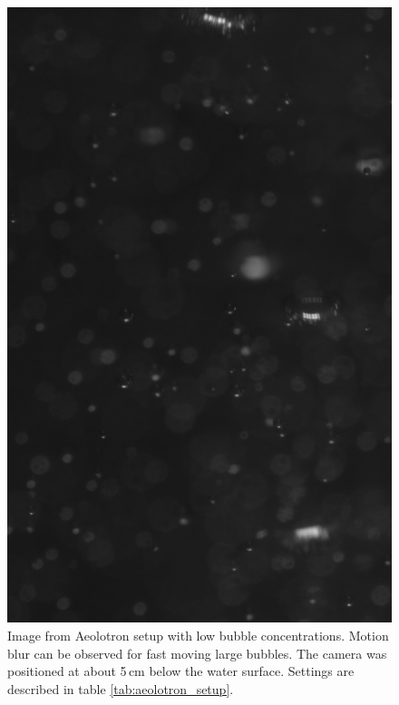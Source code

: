\begin{figure}
	\centering
	\includegraphics[scale=0.3]{images/aeolotron_result_raw.png}
	\caption{Image from Aeolotron setup with low bubble concentrations. Motion blur can be observed for fast moving large bubbles. The camera was positioned at about 5\,cm below the water surface. Settings are described in table \ref{tab:aeolotron_setup}.}
\end{figure}